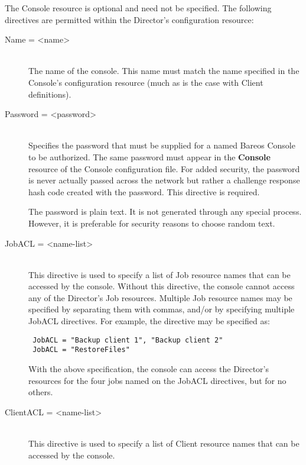 The Console resource is optional and need not be specified. The following
directives are permitted within the Director's configuration resource:

\begin{description}

\item [Name = {\textless}name{\textgreater}] \hfill \\
The name of the console. This  name must match the name specified in the
Console's configuration  resource (much as is the case with Client
definitions).

\item [Password = {\textless}password{\textgreater}] \hfill \\
Specifies the password that must be supplied for a named Bareos Console
to be authorized.  The same password must appear in the {\bf Console}
resource of the Console configuration file.  For added security, the
password is never actually passed across the network but rather a
challenge response hash code created with the password.  This directive
is required.

The password is plain text.  It is not generated through any special
process.  However, it is preferable for security reasons to choose
random text.

\item [JobACL = {\textless}name-list{\textgreater}] \hfill \\
This directive is used to specify a list of Job resource names that can
be accessed by the console.  Without this directive, the console cannot
access any of the Director's Job resources.  Multiple Job resource names
may be specified by separating them with commas, and/or by specifying
multiple JobACL directives.  For example, the directive may be specified
as:

\footnotesize
\begin{verbatim}
 JobACL = "Backup client 1", "Backup client 2"
 JobACL = "RestoreFiles"

\end{verbatim}
\normalsize

With the above specification, the console can access the Director's  resources
for the four jobs named on the JobACL directives,  but for no others.

\item [ClientACL = {\textless}name-list{\textgreater}] \hfill \\
This directive is used to  specify a list of Client resource names that can
be
accessed by  the console.


\end{description}
